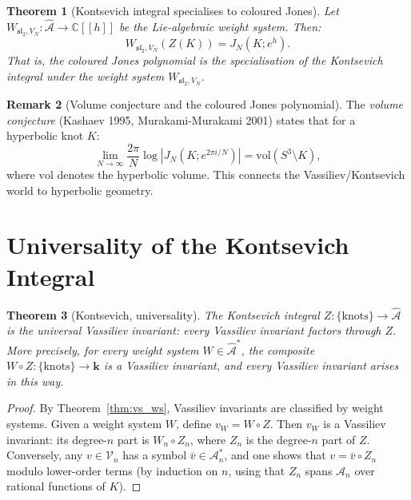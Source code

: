 \documentclass[12pt,a4paper]{amsart}
\newtheorem{theorem}{Theorem}[section]
\theoremstyle{definition}
\newtheorem{remark}[theorem]{Remark}
\newcommand{\C}{\mathbb{C}}
\newcommand{\Ac}{\mathcal{A}}
\begin{document}
\begin{theorem}[Kontsevich integral specialises to coloured Jones]
\label{thm:KI_jones}
Let $W_{\mathfrak{sl}_2, V_N}: \hat{\mathcal{A}} \to \C[[h]]$ be the
Lie-algebraic weight system.  Then:
\[
  W_{\mathfrak{sl}_2, V_N}(Z(K)) = J_N(K; e^h).
\]
That is, the coloured Jones polynomial is the specialisation of the
Kontsevich integral under the weight system $W_{\mathfrak{sl}_2, V_N}$.
\end{theorem}

\begin{remark}[Volume conjecture and the coloured Jones polynomial]
The \emph{volume conjecture} (Kashaev 1995, Murakami-Murakami 2001) states
that for a hyperbolic knot $K$:
\[
  \lim_{N \to \infty} \frac{2\pi}{N} \log|J_N(K; e^{2\pi i/N})| = \mathrm{vol}(S^3 \setminus K),
\]
where $\mathrm{vol}$ denotes the hyperbolic volume.  This connects the
Vassiliev/Kontsevich world to hyperbolic geometry.
\end{remark}

\section{Universality of the Kontsevich Integral}\label{sec:universality}

\begin{theorem}[Kontsevich, universality]\label{thm:universality}
The Kontsevich integral $Z: \{\text{knots}\} \to \hat{\mathcal{A}}$ is the
\emph{universal Vassiliev invariant}: every Vassiliev invariant factors
through $Z$.  More precisely, for every weight system $W \in \hat{\mathcal{A}}^*$,
the composite $W \circ Z: \{\text{knots}\} \to \mathbf{k}$ is a Vassiliev
invariant, and every Vassiliev invariant arises in this way.
\end{theorem}

\begin{proof}
By Theorem~\ref{thm:vs_ws}, Vassiliev invariants are classified by weight
systems.  Given a weight system $W$, define $v_W = W \circ Z$.  Then
$v_W$ is a Vassiliev invariant: its degree-$n$ part is $W_n \circ Z_n$,
where $Z_n$ is the degree-$n$ part of $Z$.  Conversely, any $v \in \mathcal{V}_n$
has a symbol $\bar{v} \in \Ac_n^*$, and one shows that $v = \bar{v} \circ Z_n$
modulo lower-order terms (by induction on $n$, using that $Z_n$ spans $\Ac_n$
over rational functions of $K$).
\end{proof}
\end{document}
